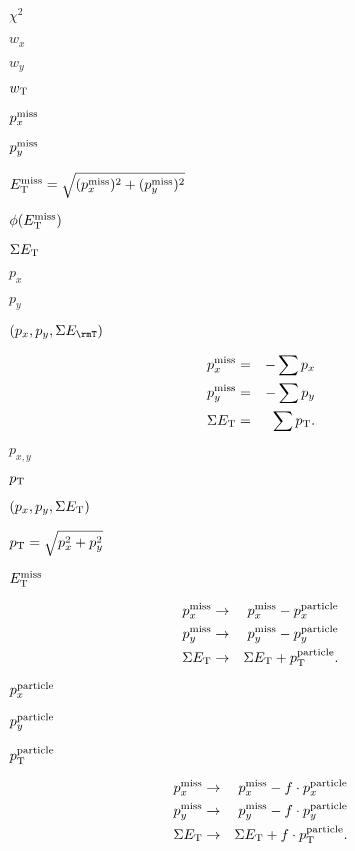 \documentclass{article}
\begin{document}
$\chi^2$
\pagebreak

$ w_{x} $
\pagebreak

$ w_{y} $
\pagebreak

$ w_{\rm T} $
\pagebreak

$ p_{x}^{\rm miss} $
\pagebreak

$ p_{y}^{\rm miss} $
\pagebreak

$ E_{\rm T}^{\rm miss} = \sqrt{(p_{x}^{\rm miss})^{2} + (p_{y}^{\rm miss})^{2}} $
\pagebreak

$ \phi(E_{\rm T}^{\rm miss}) $
\pagebreak

$ \Sigma E_{\rm T} $
\pagebreak

$ p_{x} $
\pagebreak

$ p_{y} $
\pagebreak

$(p_{x},p_{y},\Sigma E_{\rmT}) $
\pagebreak

\begin{eqnarray*} p_{x}^{\rm miss} & = & - \sum p_{x} \\ p_{y}^{\rm miss} & = & - \sum p_{y} \\ \Sigma E_{\rm T} & = & \sum p_{\rm T}. \end{eqnarray*}
\pagebreak

$ p_{x,y} $
\pagebreak

$ p_{\rm T} $
\pagebreak

$ (p_{x},p_{y},\Sigma E_{\rm T}) $
\pagebreak

$ p_{\rm T} = \sqrt{ p_{x}^{2} + p_{y}^{2} } $
\pagebreak

$ E_{\rm T}^{\rm miss} $
\pagebreak

\begin{eqnarray*} p_{x}^{\rm miss} & \to & p_{x}^{\rm miss} - p_{x}^{\rm particle} \\ p_{y}^{\rm miss} & \to & p_{y}^{\rm miss} - p_{y}^{\rm particle} \\ \Sigma E_{\rm T} & \to & \Sigma E_{\rm T} + p_{\rm T}^{\rm particle} . \end{eqnarray*}
\pagebreak

$ p_{x}^{\rm particle} $
\pagebreak

$ p_{y}^{\rm particle} $
\pagebreak

$ p_{\rm T}^{\rm particle} $
\pagebreak

\begin{eqnarray*} p_{x}^{\rm miss} & \to & p_{x}^{\rm miss} - f \cdot p_{x}^{\rm particle} \\ p_{y}^{\rm miss} & \to & p_{y}^{\rm miss} - f \cdot p_{y}^{\rm particle} \\ \Sigma E_{\rm T} & \to & \Sigma E_{\rm T} + f \cdot p_{\rm T}^{\rm particle} . \end{eqnarray*}
\pagebreak
\end{document}
